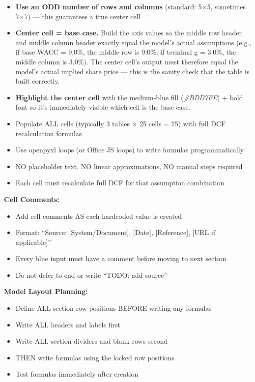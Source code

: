 \documentclass[11pt]{article}
\begin{document}
\begin{itemize}[leftmargin=*,itemsep=2pt,topsep=2pt]
\item {} \textbf{Use an ODD number of rows and columns} (standard: 5×5, sometimes 7×7) — this guarantees a true center cell
\item {} \textbf{Center cell = base case.} Build the axis values so the middle row header and middle column header exactly equal the model's actual assumptions (e.g., if base WACC = 9.0\%, the middle row is 9.0\%; if terminal g = 3.0\%, the middle column is 3.0\%). The center cell's output must therefore equal the model's actual implied share price — this is the sanity check that the table is built correctly.
\item {} \textbf{Highlight the center cell} with the medium-blue fill (\emph{\#BDD7EE}) + bold font so it's immediately visible which cell is the base case.
\item {} Populate ALL cells (typically 3 tables × 25 cells = 75) with full DCF recalculation formulas
\item {} Use openpyxl loops (or Office JS loops) to write formulas programmatically
\item {} NO placeholder text, NO linear approximations, NO manual steps required
\item {} Each cell must recalculate full DCF for that assumption combination
\end{itemize}

\textbf{Cell Comments:}

\begin{itemize}[leftmargin=*,itemsep=2pt,topsep=2pt]
\item {} Add cell comments AS each hardcoded value is created
\item {} Format: ``Source: [System/Document], [Date], [Reference], [URL if applicable]''
\item {} Every blue input must have a comment before moving to next section
\item {} Do not defer to end or write ``TODO: add source''
\end{itemize}

\textbf{Model Layout Planning:}

\begin{itemize}[leftmargin=*,itemsep=2pt,topsep=2pt]
\item {} Define ALL section row positions BEFORE writing any formulas
\item {} Write ALL headers and labels first
\item {} Write ALL section dividers and blank rows second
\item {} THEN write formulas using the locked row positions
\item {} Test formulas immediately after creation
\end{itemize}
\end{document}
